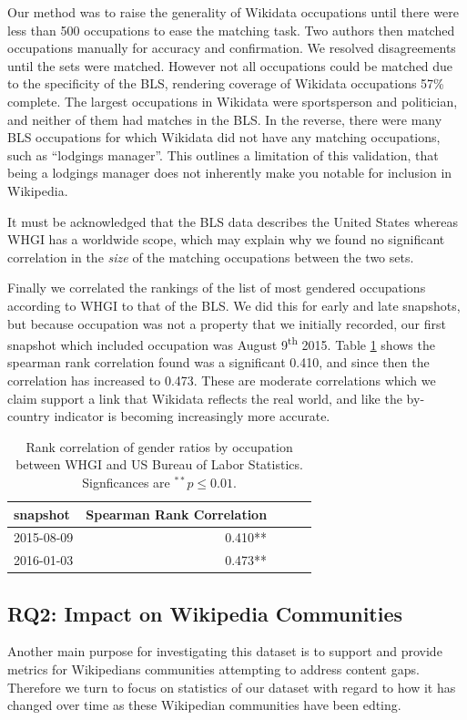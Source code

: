 \documentclass{sig-alternate-05-2015}
\begin{document}
Our method was to raise the generality of Wikidata occupations until there were less than 500 occupations to ease the matching task. Two authors then matched occupations manually for accuracy and confirmation. We resolved disagreements until the sets were matched. However not all occupations could be matched due to the specificity of the BLS, rendering coverage of Wikidata occupations 57\% complete. The largest occupations in Wikidata were sportsperson and politician, and neither of them had matches in the BLS. In the reverse, there were many BLS occupations for which Wikidata did not have any matching occupations, such as ``lodgings manager''. This outlines a limitation of this validation, that being a lodgings manager does not inherently make you notable for inclusion in Wikipedia. 

It must be acknowledged that the BLS data describes the United States whereas WHGI has a worldwide scope, which may explain why we found no significant correlation in the \textit{size} of the matching occupations between the two sets.

Finally we correlated the rankings of the list of most gendered occupations according to WHGI to that of the BLS. We did this for early and late snapshots, but because occupation was not a property that we initially recorded, our first snapshot which included occupation was August 9\textsuperscript{th} 2015.  Table \ref{table:bls} shows the spearman rank correlation found was a significant 0.410, and since then the correlation has increased to 0.473. These are moderate correlations which we claim support a link that Wikidata reflects the real world, and like the by-country indicator is becoming increasingly more accurate.

\begin{table}
\caption{Rank correlation of gender ratios by occupation between WHGI and US
Bureau of Labor Statistics. Signficances are $ ^{**}p\leq 0.01$.}
\begin{tabular}{lrrrr}
\toprule
snapshot &  Spearman Rank Correlation \\
\midrule
2015-08-09 & 0.410**  \\
2016-01-03 & 0.473**  \\
\bottomrule
\end{tabular}
\label{table:bls}
\end{table}


\subsection{RQ2: Impact on Wikipedia Communities}
Another main purpose for investigating this dataset is to support and provide metrics for Wikipedians communities attempting to  address content gaps. Therefore we turn to focus on statistics of our dataset with regard to how it has changed over time as these Wiki\-pedian communities have been edting. 
\end{document}
